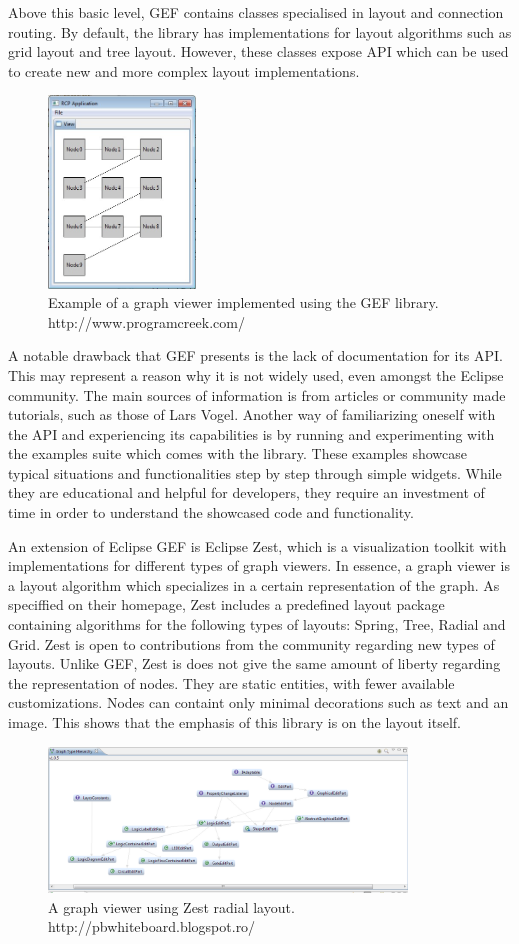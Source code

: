 Above this basic level, GEF contains classes specialised in layout and connection routing. By default, the library has implementations for 
layout algorithms such as grid layout and tree layout. However, these classes expose API which can be used to create new and more complex 
layout implementations.

\begin{figure}[ht] \centering
\includegraphics[width=0.35\textwidth]{img/relatedwork/gefexample.jpg}
\caption{Example of a graph viewer implemented using the GEF library. http://www.programcreek.com/} \end{figure}

A notable drawback that GEF presents is the lack of documentation for its API. This may represent a reason why it is not widely 
used, even amongst the Eclipse community. The main sources of information is from articles or community made tutorials, such as 
those of Lars Vogel. Another way of familiarizing oneself with the API and experiencing its capabilities is by running and experimenting 
with the examples suite which comes with the library. These examples showcase typical situations and functionalities step by step through 
simple widgets. While they are educational and helpful for developers, they require an investment of time in order to understand 
the showcased code and functionality.

An extension of Eclipse GEF is Eclipse Zest, which is a visualization toolkit with implementations for different types of graph 
viewers. In essence, a graph viewer is a layout algorithm which specializes in a certain representation of the graph. As 
speciffied on their homepage, Zest includes a predefined layout package containing algorithms for the following types of 
layouts: Spring, Tree, Radial and Grid. Zest is open to contributions from the community regarding new types of layouts.
Unlike GEF, Zest is does not give the same amount of liberty regarding the representation of nodes. They are static entities, with 
fewer available customizations. Nodes can containt only minimal decorations such as text and an image. This shows that the emphasis 
of this library is on the layout itself.

\begin{figure}[ht] \centering
\includegraphics[width=0.85\textwidth]{img/relatedwork/zest.png}
\caption{A graph viewer using Zest radial layout. http://pbwhiteboard.blogspot.ro/} \end{figure}
